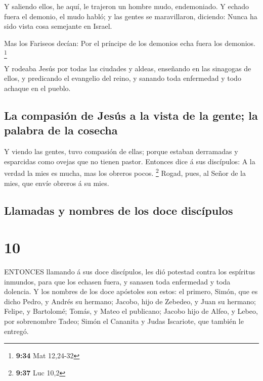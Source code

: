  Y saliendo ellos, he aquí, le trajeron un hombre mudo,
endemoniado.  Y echado fuera el demonio, el mudo habló; y
las gentes se maravillaron, diciendo: Nunca ha sido vista cosa semejante
en Israel.

 Mas los Fariseos decían: Por el príncipe de los demonios
echa fuera los demonios. \footnote{\textbf{9:34} Mat 12,24-32}

 Y rodeaba Jesús por todas las ciudades y aldeas, enseñando
en las sinagogas de ellos, y predicando el evangelio del reino, y
sanando toda enfermedad y todo achaque en el pueblo.

\hypertarget{la-compasiuxf3n-de-jesuxfas-a-la-vista-de-la-gente-la-palabra-de-la-cosecha}{%
\subsection{La compasión de Jesús a la vista de la gente; la palabra de
la
cosecha}\label{la-compasiuxf3n-de-jesuxfas-a-la-vista-de-la-gente-la-palabra-de-la-cosecha}}

 Y viendo las gentes, tuvo compasión de ellas; porque
estaban derramadas y esparcidas como ovejas que no tienen pastor.
 Entonces dice á sus discípulos: A la verdad la mies es
mucha, mas los obreros pocos. \footnote{\textbf{9:37} Luc 10,2}
 Rogad, pues, al Señor de la mies, que envíe obreros á su
mies.

\hypertarget{llamadas-y-nombres-de-los-doce-discuxedpulos}{%
\subsection{Llamadas y nombres de los doce
discípulos}\label{llamadas-y-nombres-de-los-doce-discuxedpulos}}

\hypertarget{section-9}{%
\section{10}\label{section-9}}

 ENTONCES llamando á sus doce discípulos, les dió potestad
contra los espíritus inmundos, para que los echasen fuera, y sanasen
toda enfermedad y toda dolencia.  Y los nombres de los doce
apóstoles son estos: el primero, Simón, que es dicho Pedro, y Andrés su
hermano; Jacobo, hijo de Zebedeo, y Juan su hermano; 
Felipe, y Bartolomé; Tomás, y Mateo el publicano; Jacobo hijo de Alfeo,
y Lebeo, por sobrenombre Tadeo;  Simón el Cananita y Judas
Iscariote, que también le entregó.

